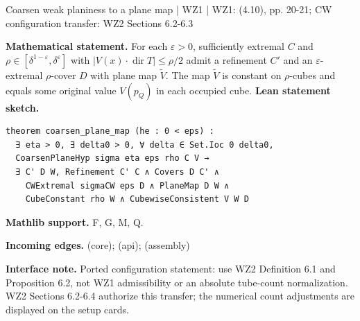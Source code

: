 \documentclass[10pt,a4paper]{article}
\newcommand{\nodecard}[1]{\hyperlink{node-#1}{\texttt{\detokenize{#1}}}}
\begin{document}
\begin{minipage}{\linewidth}
\hypertarget{node-L4_4}{}
\begin{tcolorbox}[colback=white,colframe=planefg,colbacktitle=planebg,coltitle=ink,boxrule=0.45pt,arc=1.6mm,left=3mm,right=3mm,top=2mm,bottom=2mm,title={\sffamily\bfseries WZ1 Lemma 4.4 / CW \hfill \texttt{L4\_4}}]
{\sffamily\small\color{muted}Coarsen weak planiness to a plane map | WZ1 | WZ1: (4.10), pp. 20-21; CW configuration transfer: WZ2 Sections 6.2-6.3}\par
\textbf{Mathematical statement.} For each $\varepsilon>0$, sufficiently extremal $C$ and $\rho\in[\delta^{1-\varepsilon},\delta^\varepsilon]$ with $|V(x)\cdot\operatorname{dir}T|\le\rho/2$ admit a refinement $C'$ and an $\varepsilon$-extremal $\rho$-cover $D$ with plane map $\widetilde V$.
The map $\widetilde V$ is constant on $\rho$-cubes and equals some original value $V(p_Q)$ in each occupied cube.
\smallskip\textbf{Lean statement sketch.}
\begin{Verbatim}[fontsize=\small,breaklines=true,breakanywhere=true,tabsize=2]
theorem coarsen_plane_map (he : 0 < eps) :
  ∃ eta > 0, ∃ delta0 > 0, ∀ delta ∈ Set.Ioc 0 delta0,
  CoarsenPlaneHyp sigma eta eps rho C V →
  ∃ C' D W, Refinement C' C ∧ Covers D C' ∧
    CWExtremal sigmaCW eps D ∧ PlaneMap D W ∧
    CubeConstant rho W ∧ CubewiseConsistent V W D
\end{Verbatim}
{\footnotesize\textbf{Mathlib support.} F, G, M, Q.\par
\textbf{Incoming edges.} \nodecard{W2P6_2} (core); \nodecard{Dplane} (api); \nodecard{L4_3} (assembly)\par}
{\footnotesize\textbf{Interface note.}  Ported configuration statement: use WZ2 Definition 6.1 and Proposition 6.2, not WZ1 admissibility or an absolute tube-count normalization. WZ2 Sections 6.2-6.4 authorize this transfer; the numerical count adjustments are displayed on the setup cards.}
\end{tcolorbox}\end{minipage}\par\medskip
\end{document}
